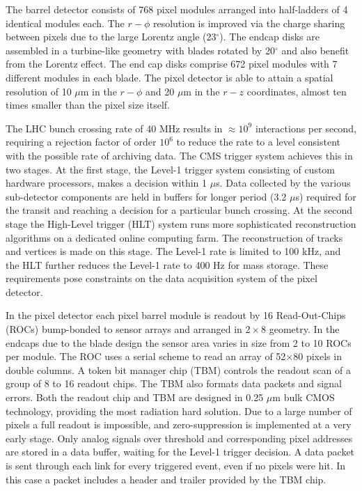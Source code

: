 The barrel detector consists of 768 pixel modules arranged into 
half-ladders of 4 identical modules
each. The $r-\phi$ resolution is improved via the charge sharing between 
pixels due to 
the large Lorentz angle (23$^\circ$).
The endcap disks are assembled in a turbine-like geometry with blades 
rotated by 20$^\circ$
and also benefit from the Lorentz effect. The end cap disks comprise 672 
pixel modules 
with 7 different modules in each blade.
The pixel detector is able to attain a spatial 
resolution of 10 $\mu$m in the $r-\phi$ and 20 $\mu$m in the $r-z$ 
coordinates, 
almost ten times smaller than the pixel size itself.

The LHC bunch crossing rate of 40 MHz results in $\approx 10^9$ 
interactions per second, 
requiring a rejection factor of order $10^6$ to reduce the rate to a level 
consistent 
with the possible rate of archiving data. The CMS trigger system achieves 
this in two stages. 
At the first stage, the Level-1 trigger system consisting of custom 
hardware processors,
makes a decision within 1 $\mu$s. 
Data collected by the various sub-detector components are held in buffers 
for longer period (3.2 $\mu$s)
required for the transit and reaching a decision for a particular bunch 
crossing. 
At the second stage the High-Level trigger (HLT) system 
runs more sophisticated reconstruction algorithms on a dedicated online 
computing farm. 
The reconstruction of tracks and vertices is made on this stage.
The Level-1 rate is limited to 100 kHz, and the HLT further reduces the 
Level-1 rate to 400 Hz 
for mass storage. These requirements pose constraints on the data 
acquisition system of the pixel 
detector.

In the pixel detector 
each pixel barrel module is readout by 16 Read-Out-Chips (ROCs)
bump-bonded to sensor arrays and 
arranged in $2\times8$ geometry.
In the endcaps due to the blade design the sensor area varies  in size 
from 2 to 10 ROCs per module.
The ROC uses a serial scheme to read an array of 52$\times$80 pixels in 
double columns.
A token bit manager chip (TBM) controls the readout scan of a group of 8 
to 16 readout chips.
The TBM also formats data packets and signal errors.  
Both the readout chip and TBM are designed in 0.25 $\mu$m bulk CMOS 
technology, 
providing the most radiation hard solution.
Due to a large number of pixels a full readout is impossible, and 
zero-suppression 
is implemented at a very early stage.
Only analog signals over threshold and corresponding pixel addresses are 
stored in a data buffer, 
waiting for the Level-1 trigger decision. 
A data packet is sent through each link for every triggered event, even if 
no pixels were hit.
In this case a packet includes a header and trailer provided by the TBM 
chip. 


